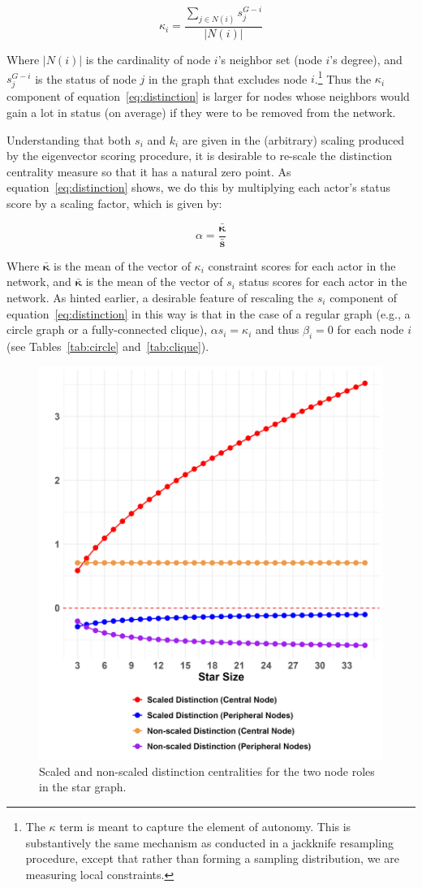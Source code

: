 \documentclass[12pt]{article}
\begin{document}
\begin{equation}
    \kappa_i = \frac{\sum_{j \in N(i)}s_j^{G-i}}{|N(i)|}
\end{equation}

Where $|N(i)|$ is the cardinality of node $i$'s neighbor set (node $i$'s degree), and $s_j^{G-i}$ is the status of node $j$ in the graph that excludes node $i$.\footnote{The $\kappa$ term is meant to capture the element of autonomy. This is substantively the same mechanism as conducted in a jackknife resampling procedure, except that rather than forming a sampling distribution, we are measuring local constraints.} Thus the $\kappa_i$ component of equation~\ref{eq:distinction} is larger for nodes whose neighbors would gain a lot in status (on average) if they were to be removed from the network. 

Understanding that both $s_i$ and $k_i$ are given in the (arbitrary) scaling produced by the eigenvector scoring procedure, it is desirable to re-scale the distinction centrality measure so that it has a natural zero point. As equation~\ref{eq:distinction} shows, we do this by multiplying each actor's status score by a scaling factor, which is given by:

\begin{equation}
    \alpha = \frac{\bar{\mathbf{\kappa}}}{\bar{\mathbf{s}}}
\end{equation}

Where $\bar{\mathbf{\kappa}}$ is the mean of the vector of $\kappa_i$ constraint scores for each actor in the network, and $\bar{\mathbf{\kappa}}$ is the mean of the vector of $s_i$ status scores for each actor in the network. As hinted earlier, a desirable feature of rescaling the $s_i$ component of equation~\ref{eq:distinction} in this way is that in the case of a regular graph (e.g., a circle graph or a fully-connected clique), $\alpha s_i = \kappa_i$ and thus $\beta_i = 0$ for each node $i$ (see Tables~\ref{tab:circle} and~\ref{tab:clique}).  

\begin{figure}[ht!]
    \centering
    \includegraphics[width=0.6\linewidth]{Plots/star-roles-by-size.png}
    \caption{Scaled and non-scaled distinction centralities for the two node roles in the star graph.}
    \label{fig:star-scaling}
\end{figure}
\end{document}
